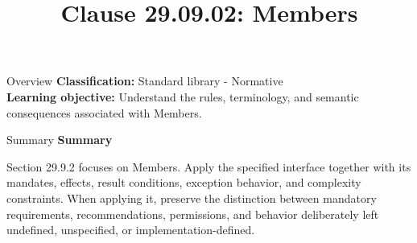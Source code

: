 \documentclass[10pt,letterpaper]{article}
\title{Clause 29.09.02: Members}
\author{}
\date{}
\begin{document}
\maketitle
\begin{CornellOverviewBox}{Overview}
\textbf{Classification:} Standard library - Normative\\[2pt]
\textbf{Learning objective:} Understand the rules, terminology, and semantic consequences associated with Members.
\end{CornellOverviewBox}\begin{CornellSummaryBox}{Summary}
{\sffamily\bfseries\color{Accent} Summary}\par\vspace{3pt}Section 29.9.2 focuses on Members. Apply the specified interface together with its mandates, effects, result conditions, exception behavior, and complexity constraints. When applying it, preserve the distinction between mandatory requirements, recommendations, permissions, and behavior deliberately left undefined, unspecified, or implementation-defined.
\end{CornellSummaryBox}
\end{document}
